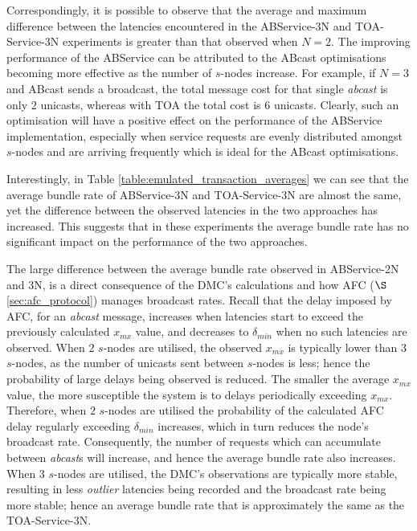 	Correspondingly, it is possible to observe that the average and maximum difference between the latencies encountered in the ABService-3N and TOA-Service-3N experiments is greater than that observed when $N = 2$.  The improving performance of the ABService can be attributed to the \textsf{ABcast} optimisations becoming more effective as the number of $s$-nodes increase.  For example, if $N = 3$ and \textsf{ABcast} sends a broadcast, the total message cost for that single \emph{abcast} is only $2$ unicasts, whereas with TOA the total cost is $6$ unicasts.  Clearly, such an optimisation will have a positive effect on the performance of the ABService implementation, especially when service requests are evenly distributed amongst $s$-nodes and are arriving frequently which is ideal for the \textsf{ABcast} optimisations.  
	
    Interestingly, in Table \ref{table:emulated_transaction_averages} we can see that the average bundle rate of ABService-3N and TOA-Service-3N are almost the same, yet the difference between the observed latencies in the two approaches has increased.  This suggests that in these experiments the average bundle rate has no significant impact on the performance of the two approaches.  
    
    The large difference between the average bundle rate observed in ABService-2N and 3N, is a direct consequence of the DMC's calculations and how AFC ($\S$ \ref{sec:afc_protocol}) manages broadcast rates.  Recall that the delay imposed by AFC, for an \emph{abcast} message, increases when latencies start to exceed the previously calculated $x_{mx}$ value, and decreases to $\delta_{min}$ when no such latencies are observed.  When $2$ $s$-nodes are utilised, the observed $x_{mx}$ is typically lower than 3 $s$-nodes, as the number of unicasts sent between $s$-nodes is less; hence the probability of large delays being observed is reduced.  The smaller the average $x_{mx}$ value, the more susceptible the system is to delays periodically exceeding $x_{mx}$.  Therefore, when $2$ $s$-nodes are utilised the probability of the calculated AFC delay regularly exceeding $\delta_{min}$ increases, which in turn reduces the node's broadcast rate.  Consequently, the number of requests which can accumulate between \emph{abcast}s will increase, and hence the average bundle rate also increases.  When $3$ $s$-nodes are utilised, the DMC's observations are typically more stable, resulting in less \emph{outlier} latencies being recorded and the broadcast rate being more stable; hence an average bundle rate that is approximately the same as the TOA-Service-3N.  
	
